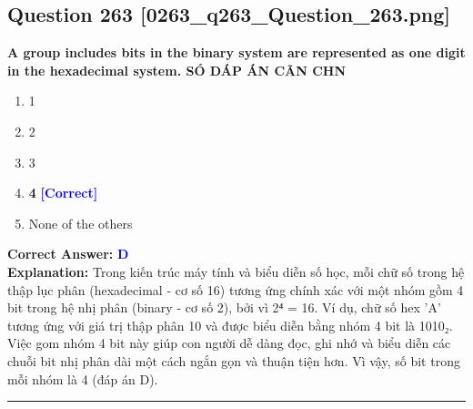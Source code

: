 \documentclass[11pt,a4paper]{article}
\begin{document}
\begin{minipage}{\textwidth}
\subsection*{Question 263 \quad \footnotesize{[0263\_q263\_Question\_263.png]}}
\noindent \textbf{A group includes bits in the binary system are represented as one digit in the hexadecimal system. SÓ DÁP ÁN CÃN CHN}

\begin{enumerate}[label=\Alph*.]
    \item 1
    \item 2
    \item 3
    \item \textbf{4} \hfill \textcolor{blue}{\textbf{[Correct]}}
    \item None of the others
\end{enumerate}

\noindent \textbf{Correct Answer:} \textcolor{blue}{\textbf{D}} \\[2pt]
\noindent \textbf{Explanation:} Trong kiến trúc máy tính và biểu diễn số học, mỗi chữ số trong hệ thập lục phân (hexadecimal - cơ số 16) tương ứng chính xác với một nhóm gồm 4 bit trong hệ nhị phân (binary - cơ số 2), bởi vì 2⁴ = 16. Ví dụ, chữ số hex 'A' tương ứng với giá trị thập phân 10 và được biểu diễn bằng nhóm 4 bit là 1010₂. Việc gom nhóm 4 bit này giúp con người dễ dàng đọc, ghi nhớ và biểu diễn các chuỗi bit nhị phân dài một cách ngắn gọn và thuận tiện hơn. Vì vậy, số bit trong mỗi nhóm là 4 (đáp án D).

\par\vspace{0.3cm}
\hrule
\vspace{0.3cm}
\end{minipage}
\end{document}
